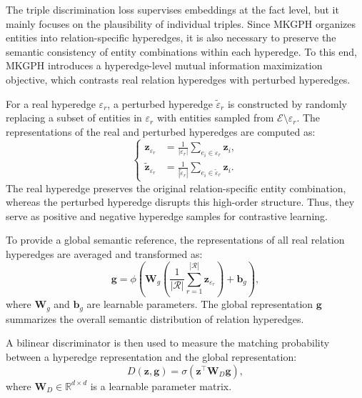 \documentclass[pdflatex,sn-mathphys-num]{sn-jnl}
\begin{document}
The triple discrimination loss supervises embeddings at the fact level, but it mainly focuses on the plausibility of individual triples. Since MKGPH organizes entities into relation-specific hyperedges, it is also necessary to preserve the semantic consistency of entity combinations within each hyperedge. To this end, MKGPH introduces a hyperedge-level mutual information maximization objective, which contrasts real relation hyperedges with perturbed hyperedges.

For a real hyperedge $\varepsilon_r$, a perturbed hyperedge $\widetilde{\varepsilon}_r$ is constructed by randomly replacing a subset of entities in $\varepsilon_r$ with entities sampled from $\mathcal{E}\setminus\varepsilon_r$. The representations of the real and perturbed hyperedges are computed as:
\begin{equation}
\left\{
\begin{aligned}
\mathbf{z}_{\varepsilon_r}
&=
\frac{1}{|\varepsilon_r|}
\sum_{e_i\in\varepsilon_r}
\mathbf{z}_i, \\
\widetilde{\mathbf{z}}_{\varepsilon_r}
&=
\frac{1}{|\widetilde{\varepsilon}_r|}
\sum_{e_i\in\widetilde{\varepsilon}_r}
\mathbf{z}_i.
\end{aligned}
\right.
\end{equation}
The real hyperedge preserves the original relation-specific entity combination, whereas the perturbed hyperedge disrupts this high-order structure. Thus, they serve as positive and negative hyperedge samples for contrastive learning.

To provide a global semantic reference, the representations of all real relation hyperedges are averaged and transformed as:
\begin{equation}
\mathbf{g}
=
\phi
\left(
\mathbf{W}_{g}
\left(
\frac{1}{|\mathcal{R}|}
\sum_{r=1}^{|\mathcal{R}|}
\mathbf{z}_{\varepsilon_r}
\right)
+
\mathbf{b}_{g}
\right),
\end{equation}
where $\mathbf{W}_{g}$ and $\mathbf{b}_{g}$ are learnable parameters. The global representation $\mathbf{g}$ summarizes the overall semantic distribution of relation hyperedges.

A bilinear discriminator is then used to measure the matching probability between a hyperedge representation and the global representation:
\begin{equation}
D(\mathbf{z},\mathbf{g})
=
\sigma
\left(
\mathbf{z}^{\top}
\mathbf{W}_{D}
\mathbf{g}
\right),
\end{equation}
where $\mathbf{W}_{D}\in\mathbb{R}^{d\times d}$ is a learnable parameter matrix.
\end{document}
